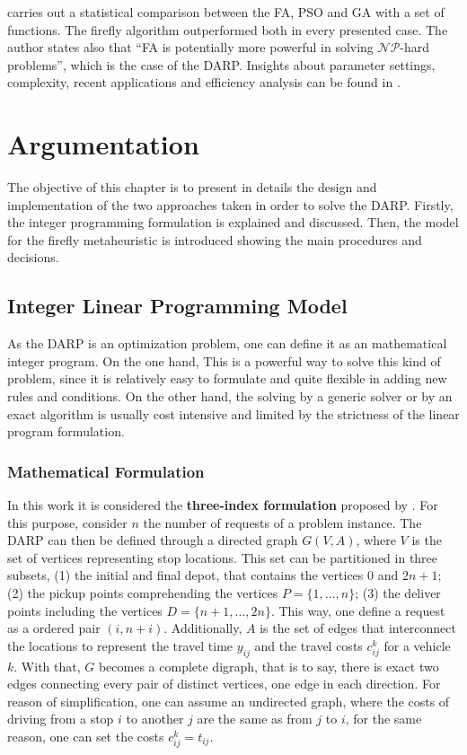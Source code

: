 \documentclass[tuberlin,cic,tc,openright,english,noabntcite,oneside]{iiufrgs}
\begin{document}
\textcite[p. 177]{yang_firefly_2009} carries out a statistical comparison between the FA, PSO and GA with a set of functions. The firefly algorithm outperformed both in every presented case. The author states also that \enquote{FA is potentially more powerful in solving $\mathcal{NP}$-hard problems}, which is the case of the DARP. Insights about parameter settings, complexity, recent applications and efficiency analysis can be found in \textcite{yang_firefly_2013}.

\chapter{Argumentation}
The objective of this chapter is to present in details the design and implementation of the two approaches taken in order to solve the DARP. Firstly, the integer programming formulation is explained and discussed. Then, the model for the firefly metaheuristic is introduced showing the main procedures and decisions.

\section{Integer Linear Programming Model}
As the DARP is an optimization problem, one can define it as an mathematical integer program. On the one hand, This is a powerful way to solve this kind of problem, since it is relatively easy to formulate and quite flexible in adding new rules  and conditions. On the other hand, the solving by a generic solver or by an exact algorithm is usually cost intensive and limited by the strictness of the linear program formulation.

\subsection{Mathematical Formulation}
In this work it is considered the \textbf{three-index formulation} proposed by \textcite[p. 574-575]{cordeau_branch-and-cut_2006}. For this purpose, consider $n$ the number of requests of a problem instance. The DARP can then be defined through a directed graph $G(V,A)$, where $V$ is the set of vertices representing stop locations. This set can be partitioned in three subsets, (1) the initial and final depot, that contains the vertices $0$ and $2n+1$; (2) the pickup points comprehending the vertices $P=\{1,\dotsc,n\}$; (3) the deliver points including the vertices $D=\{n+1,\dotsc,2n\}$. This way, one define a request as a ordered pair $(i,n+i)$. Additionally, $A$ is the set of edges that interconnect the locations to represent the travel time $y_{ij}$ and the travel costs $c_{ij}^{k}$ for a vehicle $k$. With that, $G$ becomes a complete digraph, that is to say, there is exact two edges connecting every pair of distinct vertices, one edge in each direction. For reason of simplification, one can assume an undirected graph, where the costs of driving from a stop $i$ to another $j$ are the same as from $j$ to $i$, for the same reason, one can set the costs $c_{ij}^{k} = t_{ij}$.
\end{document}
